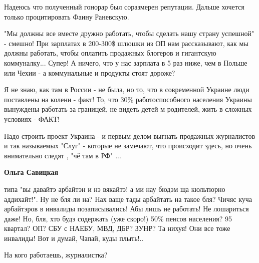 \begin{itemize}
 
Надеюсь что полученный гонорар был соразмерен репутации. Дальше хочется только процитировать Фаину Раневскую.


"Мы должны все вместе дружно работать, чтобы сделать нашу страну успешной" -
смешно! При зарплатах в 200-300\$ шлюшки из ОП нам рассказывают, как мы должны
работать, чтобы оплатить продажных блогеров и гигантскую коммуналку... Супер! А
ничего, что у нас зарплата в 5 раз ниже, чем в Польше или Чехии - а
коммунальные и продукты стоят дороже? 

Я не знаю, как там в России - не была, но то, что в современной Украине люди
поставлены на колени - факт! То, что 30\% работоспособного населения Украины
вынуждены работать за границей, не видеть детей м родителей, жить в сложных
условиях - ФАКТ! 

Надо строить проект Украина - и первым делом выгнать продажных журналистов и
так называемых "Слуг" - которые не замечают, что происходит здесь, но очень
внимательно следят , "чё там в РФ" ...

\begin{itemize}
 
\textbf{Ольга Савицкая} 

типа "вы давайтэ арбайтэн и нэ вякайтэ! а ми нау бюдэм ща кюльтюрно аддихайт!".
Ну не бля ли на? Нах ваще тады арбайтать на такое бля? Чичяс куча арбайтэров в
инвалиды позаписывались! Абы лишь не работать! Не лошариться даже! Но, бля, хто
будэ содержать (уже скоро!) 50\% пенсов населения? 95 квартал? ОП? СБУ с НАЕБУ,
МВД, ДБР? ЗУНР? Та нихуя! Они все тоже инвалиды! Вот и думай, Чапай, куды
плыть!..

\end{itemize}

 
На кого работаешь, журналистка?

 

\end{itemize}
